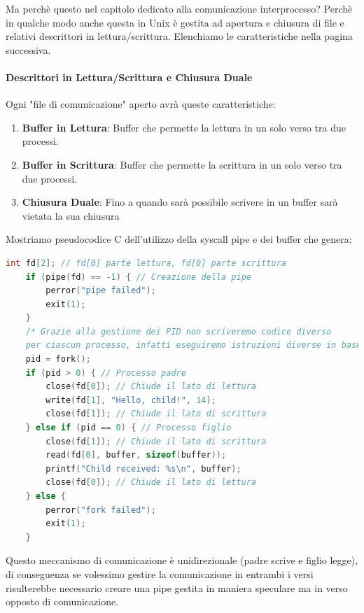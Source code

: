 \documentclass{article}
\begin{document}
Ma perchè questo nel capitolo dedicato alla comunicazione interprocesso? Perchè in qualche modo anche questa in Unix è gestita ad apertura e chiusura
di file e relativi descrittori in lettura/scrittura. Elenchiamo le caratteristiche nella pagina successiva.

\newpage

\paragraph{Descrittori in Lettura/Scrittura e Chiusura Duale} Ogni "file di comunicazione" aperto avrà queste caratteristiche:

\begin{enumerate}
    \item \textbf{Buffer in Lettura}: Buffer che permette la lettura in un solo verso tra due processi.
    \item \textbf{Buffer in Scrittura}: Buffer che permette la scrittura in un solo verso tra due processi.
    \item \textbf{Chiusura Duale}: Fino a quando sarà possibile scrivere in un buffer sarà vietata la sua chiusura
\end{enumerate}

Mostriamo pseudocodice C dell'utilizzo della syscall pipe e dei buffer che genera:

\vspace*{10px}
\begin{lstlisting}[language = C]
    int fd[2]; // fd[0] parte lettura, fd[0] parte scrittura
    if (pipe(fd) == -1) { // Creazione della pipe
        perror("pipe failed");
        exit(1);
    }
    /* Grazie alla gestione dei PID non scriveremo codice diverso
    per ciascun processo, infatti eseguiremo istruzioni diverse in base al valore del PID */
    pid = fork();
    if (pid > 0) { // Processo padre
        close(fd[0]); // Chiude il lato di lettura
        write(fd[1], "Hello, child!", 14);
        close(fd[1]); // Chiude il lato di scrittura
    } else if (pid == 0) { // Processo figlio
        close(fd[1]); // Chiude il lato di scrittura
        read(fd[0], buffer, sizeof(buffer));
        printf("Child received: %s\n", buffer);
        close(fd[0]); // Chiude il lato di lettura
    } else {
        perror("fork failed");
        exit(1);
    }
\end{lstlisting}

Questo meccanismo di comunicazione è unidirezionale (padre scrive e figlio legge), di conseguenza se volessimo gestire la comunicazione in entrambi i versi
risulterebbe necessario creare una pipe gestita in maniera speculare ma in verso opposto di comunicazione.
\end{document}
